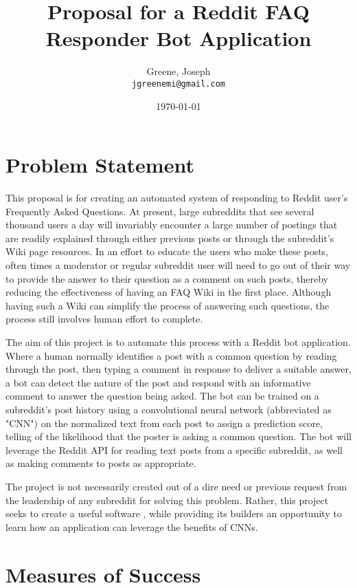 \documentclass[dvips,11pt]{article}
\begin{document}
\title{Proposal for a Reddit FAQ Responder Bot Application}
\author{
Greene, Joseph \\
\texttt{jgreenemi@gmail.com}
}
\date{\today}

\maketitle

\section{Problem Statement}

This proposal is for creating an automated system of responding to Reddit user's Frequently Asked Questions. At present, large subreddits that see several thousand users a day will invariably encounter a large number of postings that are readily explained through either previous posts or through the subreddit's Wiki page resources. In an effort to educate the users who make these posts, often times a moderator or regular subreddit user will need to go out of their way to provide the answer to their question as a comment on such posts, thereby reducing the effectiveness of having an FAQ Wiki in the first place. Although having such a Wiki can simplify the process of answering such questions, the process still involves human effort to complete.

The aim of this project is to automate this process with a Reddit bot application. Where a human normally identifies a post with a common question by reading through the post, then typing a comment in response to deliver a suitable answer, a bot can detect the nature of the post and respond with an informative comment to answer the question being asked. The bot can be trained on a subreddit's post history using a convolutional neural network (abbreviated as "CNN") on the normalized text from each post to assign a prediction score, telling of the likelihood that the poster is asking a common question. The bot will leverage the Reddit API for reading text posts from a specific subreddit, as well as making comments to posts as appropriate.

The project is not necessarily created out of a dire need or previous request from the leadership of any subreddit for solving this problem. Rather, this project seeks to create a useful software , while providing its builders an opportunity to learn how an application can leverage the benefits of CNNs.

\section{Measures of Success}
\end{document}
